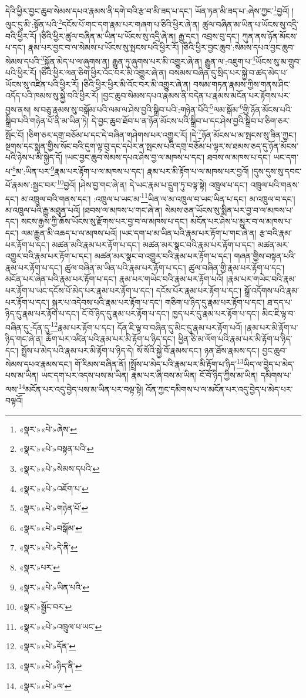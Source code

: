 དེའི་ཕྱིར་བྱང་ཆུབ་སེམས་དཔའ་རྣམས་ནི་དགེ་བའི་རྩ་བ་མི་ཟད་པ་དང་། ཡོན་ཏན་མི་ཟད་པ་:ཞེས་ཀྱང་\footnote{«སྣར་»«པེ་»ཞེས་}བྱའོ། །ལུང་དུ་མི་:སྟོན་པའི་\footnote{«སྣར་»«པེ་»བསྟན་པའི་}དངོས་པོ་གང་དག་རྣམ་པར་གཞག་པ་ཅིའི་ཕྱིར་ཞེ་ན། ཚུལ་བཞིན་མ་ཡིན་པ་ཡོངས་སུ་འདྲི་བའི་ཕྱིར་རོ། །ཅིའི་ཕྱིར་ཚུལ་བཞིན་མ་ཡིན་པ་ཡོངས་སུ་འདྲི་ཞེ་ན། རྒྱུ་དང་། འབྲས་བུ་དང་། ཀུན་ནས་ཉོན་མོངས་པ་དང་། རྣམ་པར་བྱང་བ་ལ་སེམས་པ་ཡོངས་སུ་སྤངས་པའི་ཕྱིར་རོ། །ཅིའི་ཕྱིར་བྱང་ཆུབ་:སེམས་དཔའ་བྱང་ཆུབ་སེམས་དཔའི་\footnote{«སྣར་»«པེ་»སེམས་དཔའི་}སྐྱོན་མེད་པ་ལ་ཞུགས་ན། རྒྱུན་ཏུ་ཞུགས་པར་མི་འགྱུར་ཞེ་ན། རྒྱུན་ལ་:འཇུག་པ་\footnote{«སྣར་»«པེ་»འཇོག་པ་}ཡོངས་སུ་མ་གྲུབ་པའི་ཕྱིར་རོ། །ཅིའི་ཕྱིར་ལན་ཅིག་ཕྱིར་འོང་བར་མི་འགྱུར་ཞེ་ན། བསམས་བཞིན་དུ་སྲིད་པར་སྐྱེ་བ་ཚད་མེད་པ་ཡོངས་སུ་འཛིན་པའི་ཕྱིར་རོ། །ཅིའི་ཕྱིར་ཕྱིར་མི་འོང་བར་མི་འགྱུར་ཞེ་ན། བསམ་གཏན་རྣམས་ཀྱིས་གནས་ཤིང་འདོད་པའི་ཁམས་སུ་སྐྱེ་བའི་ཕྱིར་རོ། །བྱང་ཆུབ་སེམས་དཔའ་རྣམས་ནི་བདེན་པ་རྣམས་མངོན་པར་རྟོགས་པར་བྱས་ནས། ས་བཅུ་རྣམས་སུ་བསྒོམ་པའི་ལམ་ལ་ཤེས་བྱའི་སྒྲིབ་པའི་:གཉེན་པོའི་\footnote{«སྣར་»«པེ་»གཉེན་པོ་}ལམ་སྒོམ་\footnote{«སྣར་»«པེ་»བསྒོམ་}གྱི་ཉོན་མོངས་པའི་སྒྲིབ་པའི་གཉེན་པོ་ནི་མ་ཡིན་ཏེ། དེ་བྱང་ཆུབ་ཐོབ་པ་ན་ཉོན་མོངས་པའི་སྒྲིབ་པ་དང་ཤེས་བྱའི་སྒྲིབ་པ་ཅིག་ཅར་སྤོང་ངོ། །ཅིག་ཅར་དགྲ་བཅོམ་པ་དང་དེ་བཞིན་གཤེགས་པར་འགྱུར་རོ། །དེ་\footnote{«སྣར་»«པེ་»དེ་ནི་}ཉོན་མོངས་པ་མ་སྤངས་སུ་ཟིན་ཀྱང་། སྔགས་དང་སྨན་གྱིས་སོང་བའི་དུག་ལྟ་བུ་དང་དཔེར་ན་སྤངས་པའི་དགྲ་བཅོམ་པ་ལྟར་ས་ཐམས་ཅད་དུ་ཉོན་མོངས་པའི་ཉེས་པ་མི་སྐྱེད་དོ། །ཡང་བྱང་ཆུབ་སེམས་དཔའ་ཤེས་བྱ་ལ་མཁས་པ་དང་། ཐབས་ལ་མཁས་པ་དང་། ཡང་དག་པ་\footnote{«སྣར་»པར་}མ་:ཡིན་པར་\footnote{«སྣར་»«པེ་»ཡིན་པའི་}རྣམ་པར་རྟོག་པ་ལ་མཁས་པ་དང་། རྣམ་པར་མི་རྟོག་པ་ལ་མཁས་པར་བྱའོ། །དུས་དུས་སུ་དབང་པོ་རྣམས་:སྦྱང་བར་\footnote{«སྣར་»སྦྱོང་བར་}བྱའོ། །ཤེས་བྱ་གང་ཞེ་ན། དེ་ཡང་རྣམ་པ་དྲུག་ཏུ་བལྟ་སྟེ། འཁྲུལ་པ་དང་། འཁྲུལ་པའི་གནས་དང་། མ་འཁྲུལ་བའི་གནས་དང་། :འཁྲུལ་པ་ཡང་མ་\footnote{«སྣར་»«པེ་»འཁྲུལ་པ་ཡང་}ཡིན་ལ་མ་འཁྲུལ་བ་ཡང་ཡིན་པ་དང་། མ་འཁྲུལ་བ་དང་། མ་འཁྲུལ་པའི་རྒྱུ་མཐུན་པའོ། །ཐབས་ལ་མཁས་པ་གང་ཞེ་ན། སེམས་ཅན་ཡོངས་སུ་སྨིན་པར་བྱ་བ་ལ་མཁས་པ་དང་། སངས་རྒྱས་ཀྱི་ཆོས་ཡོངས་སུ་རྫོགས་པར་བྱ་བ་ལ་མཁས་པ་དང་། མངོན་པར་ཤེས་པ་མྱུར་བ་ལ་མཁས་པ་དང་། ལམ་རྒྱུན་མི་འཆད་པ་ལ་མཁས་པའོ། །ཡང་དག་པ་མ་ཡིན་པའི་རྣམ་པར་རྟོག་པ་གང་ཞེ་ན། རྩ་བའི་རྣམ་པར་རྟོག་པ་དང་། མཚན་མའི་རྣམ་པར་རྟོག་པ་དང་། མཚན་མར་སྣང་བའི་རྣམ་པར་རྟོག་པ་དང་། མཚན་མར་འགྱུར་བའི་རྣམ་པར་རྟོག་པ་དང་། མཚན་མར་སྣང་བ་འགྱུར་བའི་རྣམ་པར་རྟོག་པ་དང་། གཞན་གྱིས་བསྟན་པའི་རྣམ་པར་རྟོག་པ་དང་། ཚུལ་བཞིན་མ་ཡིན་པའི་རྣམ་པར་རྟོག་པ་དང་། ཚུལ་བཞིན་གྱི་རྣམ་པར་རྟོག་པ་དང་། མངོན་པར་ཞེན་པའི་རྣམ་པར་རྟོག་པ་དང་། རྣམ་པར་གཡེང་བའི་རྣམ་པར་རྟོག་པའོ། །རྣམ་པར་གཡེང་བའི་རྣམ་པར་རྟོག་པ་ཡང་དངོས་པོ་མེད་པར་རྣམ་པར་རྟོག་པ་དང་། དངོས་པོར་རྣམ་པར་རྟོག་པ་དང་། སྒྲོ་འདོགས་པའི་རྣམ་པར་རྟོག་པ་དང་། སྐུར་པ་འདེབས་པའི་རྣམ་པར་རྟོག་པ་དང་། གཅིག་པ་ཉིད་དུ་རྣམ་པར་རྟོག་པ་དང་། ཐ་དད་པ་ཉིད་དུ་རྣམ་པར་རྟོག་པ་དང་། ངོ་བོ་ཉིད་དུ་རྣམ་པར་རྟོག་པ་དང་། ཁྱད་པར་དུ་རྣམ་པར་རྟོག་པ་དང་། མིང་ཇི་ལྟ་བ་བཞིན་དུ་:དོན་དུ་\footnote{«སྣར་»«པེ་»དོན་}རྣམ་པར་རྟོག་པ་དང་། དོན་ཇི་ལྟ་བ་བཞིན་དུ་མིང་དུ་རྣམ་པར་རྟོག་པའོ། །རྣམ་པར་མི་རྟོག་པ་ཉིད་གང་ཞེ་ན། ཆོག་པར་འཛིན་པའི་རྣམ་པར་མི་རྟོག་པ་ཉིད་དང་། ཕྱིན་ཅི་མ་ལོག་པའི་རྣམ་པར་མི་རྟོག་པ་ཉིད་དང་། སྤྲོས་པ་མེད་པའི་རྣམ་པར་མི་རྟོག་པ་ཉིད་དེ། སོ་སོའི་སྐྱེ་བོ་རྣམས་དང་། ཉན་ཐོས་རྣམས་དང་། བྱང་ཆུབ་སེམས་དཔའ་རྣམས་དང་། གོ་རིམས་བཞིན་ནོ། །སྤྲོས་པ་མེད་པའི་རྣམ་པར་མི་རྟོག་པ་ཉིད་\footnote{«སྣར་»«པེ་»ཉིད་ནི་}ཡིད་ལ་བྱེད་པ་མེད་པས་མ་ཡིན། ཡང་དག་པར་འདས་པས་མ་ཡིན། རྣམ་པར་ཞི་བས་མ་ཡིན། ངོ་བོ་ཉིད་ཀྱིས་མ་ཡིན། དམིགས་པ་ལས་\footnote{«སྣར་»«པེ་»ལ་}མངོན་པར་འདུ་བྱེད་པས་མ་ཡིན་པར་བལྟ་སྟེ། འོན་ཀྱང་དམིགས་པ་ལ་མངོན་པར་འདུ་བྱེད་པ་མེད་པར་བལྟའོ། 